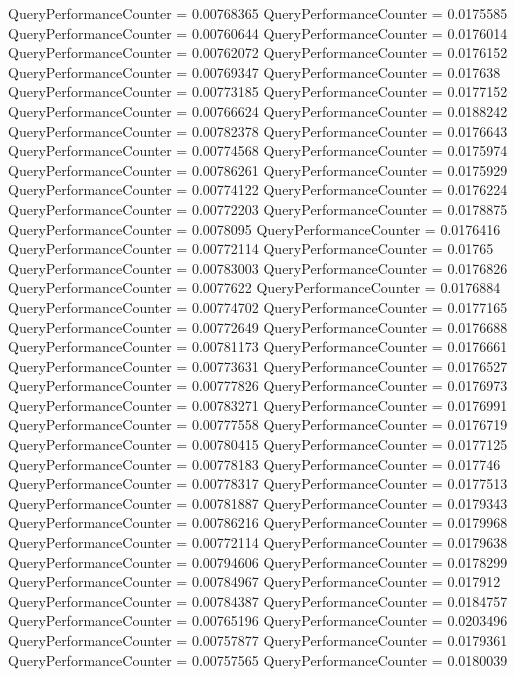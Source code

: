 \documentclass[9pt]{article}
\theoremstyle{plain}
\theoremstyle{definition}
\theoremstyle{remark}
\numberwithin{equation}{section}
\begin{document}
QueryPerformanceCounter  =  0.00768365
QueryPerformanceCounter  =  0.0175585
QueryPerformanceCounter  =  0.00760644
QueryPerformanceCounter  =  0.0176014
QueryPerformanceCounter  =  0.00762072
QueryPerformanceCounter  =  0.0176152
QueryPerformanceCounter  =  0.00769347
QueryPerformanceCounter  =  0.017638
QueryPerformanceCounter  =  0.00773185
QueryPerformanceCounter  =  0.0177152
QueryPerformanceCounter  =  0.00766624
QueryPerformanceCounter  =  0.0188242
QueryPerformanceCounter  =  0.00782378
QueryPerformanceCounter  =  0.0176643
QueryPerformanceCounter  =  0.00774568
QueryPerformanceCounter  =  0.0175974
QueryPerformanceCounter  =  0.00786261
QueryPerformanceCounter  =  0.0175929
QueryPerformanceCounter  =  0.00774122
QueryPerformanceCounter  =  0.0176224
QueryPerformanceCounter  =  0.00772203
QueryPerformanceCounter  =  0.0178875
QueryPerformanceCounter  =  0.0078095
QueryPerformanceCounter  =  0.0176416
QueryPerformanceCounter  =  0.00772114
QueryPerformanceCounter  =  0.01765
QueryPerformanceCounter  =  0.00783003
QueryPerformanceCounter  =  0.0176826
QueryPerformanceCounter  =  0.0077622
QueryPerformanceCounter  =  0.0176884
QueryPerformanceCounter  =  0.00774702
QueryPerformanceCounter  =  0.0177165
QueryPerformanceCounter  =  0.00772649
QueryPerformanceCounter  =  0.0176688
QueryPerformanceCounter  =  0.00781173
QueryPerformanceCounter  =  0.0176661
QueryPerformanceCounter  =  0.00773631
QueryPerformanceCounter  =  0.0176527
QueryPerformanceCounter  =  0.00777826
QueryPerformanceCounter  =  0.0176973
QueryPerformanceCounter  =  0.00783271
QueryPerformanceCounter  =  0.0176991
QueryPerformanceCounter  =  0.00777558
QueryPerformanceCounter  =  0.0176719
QueryPerformanceCounter  =  0.00780415
QueryPerformanceCounter  =  0.0177125
QueryPerformanceCounter  =  0.00778183
QueryPerformanceCounter  =  0.017746
QueryPerformanceCounter  =  0.00778317
QueryPerformanceCounter  =  0.0177513
QueryPerformanceCounter  =  0.00781887
QueryPerformanceCounter  =  0.0179343
QueryPerformanceCounter  =  0.00786216
QueryPerformanceCounter  =  0.0179968
QueryPerformanceCounter  =  0.00772114
QueryPerformanceCounter  =  0.0179638
QueryPerformanceCounter  =  0.00794606
QueryPerformanceCounter  =  0.0178299
QueryPerformanceCounter  =  0.00784967
QueryPerformanceCounter  =  0.017912
QueryPerformanceCounter  =  0.00784387
QueryPerformanceCounter  =  0.0184757
QueryPerformanceCounter  =  0.00765196
QueryPerformanceCounter  =  0.0203496
QueryPerformanceCounter  =  0.00757877
QueryPerformanceCounter  =  0.0179361
QueryPerformanceCounter  =  0.00757565
QueryPerformanceCounter  =  0.0180039
\end{document}
